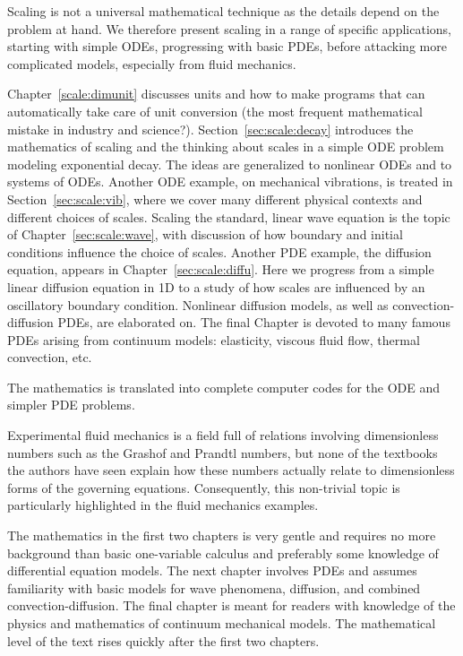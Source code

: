 \documentclass[graybox,envcountchap,sectrefs,final]{svmonodo}
\begin{document}
Scaling is not a universal mathematical technique as the details
depend on the problem at hand. We therefore present scaling in a range
of specific applications, starting with simple ODEs, progressing with
basic PDEs, before attacking more complicated models, especially from
fluid mechanics.

Chapter~\ref{scale:dimunit} discusses units and how to make programs
that can automatically take care of unit conversion (the most frequent
mathematical mistake in industry and science?).  Section~\ref{sec:scale:decay} introduces the mathematics of scaling and the
thinking about scales in a simple ODE problem modeling exponential
decay. The ideas are generalized to nonlinear ODEs and to systems of
ODEs.  Another ODE example, on mechanical vibrations, is treated in
Section~\ref{sec:scale:vib}, where we cover many different physical
contexts and different choices of scales.  Scaling the standard,
linear wave equation is the topic of Chapter~\ref{sec:scale:wave}, with
discussion of how boundary and initial conditions influence the choice
of scales.  Another PDE example, the diffusion equation, appears in
Chapter~\ref{sec:scale:diffu}. Here we progress from a simple linear
diffusion equation in 1D to a study of how scales are influenced by
an oscillatory boundary condition. Nonlinear diffusion models, as well as
convection-diffusion PDEs, are elaborated on.  The final Chapter is
devoted to many famous PDEs arising from continuum models: elasticity,
viscous fluid flow, thermal convection, etc.

The mathematics is translated into complete computer codes for the
ODE and simpler PDE problems.

Experimental fluid mechanics is a field full of relations involving
dimensionless numbers such as the Grashof and Prandtl
numbers, but none of the textbooks the authors have seen explain how
these numbers actually relate to dimensionless forms of the governing
equations. Consequently, this non-trivial topic is particularly
highlighted in the fluid mechanics examples.

The mathematics in the first two chapters is very gentle and requires
no more background than basic one-variable calculus and preferably
some knowledge of differential equation models. The next chapter
involves PDEs and assumes familiarity with basic models for wave
phenomena, diffusion, and combined convection-diffusion. The final
chapter is meant for readers with knowledge of the physics and
mathematics of continuum mechanical models. The mathematical level of
the text rises quickly after the first two chapters.
\end{document}
